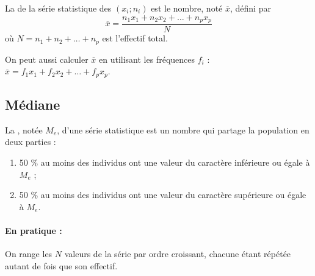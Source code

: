 \begin{definition}
    La  de la série statistique des $(x_i;n_i)$ est le
  nombre, noté $\overline{x}$, défini par
  \[
  \overline{x} =
  \frac{n_1x_1+n_2x_2+{\ldots}+n_px_p}{N} 
  \]
  où $N = n_1+n_2+{\ldots}+n_p$ est l'effectif total.

    
\end{definition}

\bigskip


\medskip

\begin{remark}
On peut aussi calculer $\overline{x}$ en utilisant les fréquences
  $f_i$ : \\[1ex]
  $ \overline{x} = f_1 x_1 + f_2x_2+{\ldots}+f_px_p $. 

    
\end{remark}

\bigskip



\subsection{Médiane}

\begin{definition}
    La , notée $M_e$, d'une série statistique est un
  nombre qui partage la population en deux parties :
  \begin{enumerate}
  \item 50 \% au moins des individus ont une valeur du caractère
    inférieure ou égale à $M_e$ ;
  \item 50 \% au moins des individus ont une valeur du caractère
    supérieure ou égale à $M_e$.
  \end{enumerate}  

    
\end{definition}


\paragraph{En pratique :}On range les $N$ valeurs de la série par ordre
  croissant, chacune étant répétée autant de fois que son effectif.


